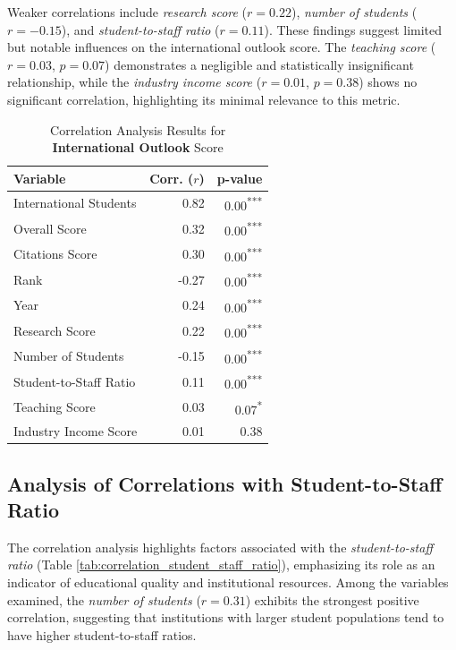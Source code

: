 \documentclass[sigconf]{acmart}
\begin{document}
Weaker correlations include \textit{research score} ($r = 0.22$), \textit{number of students} ($r = -0.15$), and \textit{student-to-staff ratio} ($r = 0.11$). These findings suggest limited but notable influences on the international outlook score. The \textit{teaching score} ($r = 0.03$, $p = 0.07$) demonstrates a negligible and statistically insignificant relationship, while the \textit{industry income score} ($r = 0.01$, $p = 0.38$) shows no significant correlation, highlighting its minimal relevance to this metric.

\begin{table}[h!]
	\centering
	\caption{Correlation Analysis Results for \textbf{International Outlook} Score}
	\label{tab:correlation_international_outlook}
	\begin{tabular}{|l|r|r|}
		\hline
		\textbf{Variable} & \textbf{Corr. ($r$)} & \textbf{p-value} \\
		\hline
		International Students & 0.82 & 0.00\textsuperscript{***} \\
		Overall Score & 0.32 & 0.00\textsuperscript{***} \\
		Citations Score & 0.30 & 0.00\textsuperscript{***} \\
		Rank & -0.27 & 0.00\textsuperscript{***} \\
		Year & 0.24 & 0.00\textsuperscript{***} \\
		Research Score & 0.22 & 0.00\textsuperscript{***} \\
		Number of Students & -0.15 & 0.00\textsuperscript{***} \\
		Student-to-Staff Ratio & 0.11 & 0.00\textsuperscript{***} \\
		Teaching Score & 0.03 & 0.07\textsuperscript{*} \\
		Industry Income Score & 0.01 & 0.38 \\
		\hline
	\end{tabular}
\end{table}


\subsection{Analysis of Correlations with Student-to-Staff Ratio}

The correlation analysis highlights factors associated with the \textit{student-to-staff ratio} (Table \ref{tab:correlation_student_staff_ratio}), emphasizing its role as an indicator of educational quality and institutional resources. Among the variables examined, the \textit{number of students} ($r = 0.31$) exhibits the strongest positive correlation, suggesting that institutions with larger student populations tend to have higher student-to-staff ratios.
\end{document}
